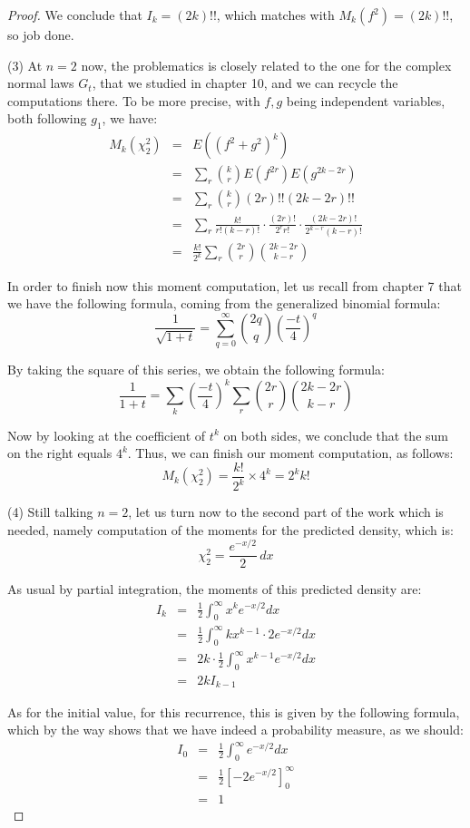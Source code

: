 \documentclass[12pt]{amsbook}
\begin{document}
\begin{proof}
We conclude that $I_k=(2k)!!$, which matches with $M_k(f^2)=(2k)!!$, so job done.

\medskip

(3) At $n=2$ now, the problematics is closely related to the one for the complex normal laws $G_t$, that we studied in chapter 10, and we can recycle the computations there. To be more precise, with $f,g$ being independent variables, both following $g_1$, we have:
\begin{eqnarray*}
M_k(\chi_2^2)
&=&E((f^2+g^2)^k)\\
&=&\sum_r\binom{k}{r}E(f^{2r})E(g^{2k-2r})\\
&=&\sum_r\binom{k}{r}(2r)!!(2k-2r)!!\\
&=&\sum_r\frac{k!}{r!(k-r)!}\cdot\frac{(2r)!}{2^rr!}\cdot\frac{(2k-2r)!}{2^{k-r}(k-r)!}\\
&=&\frac{k!}{2^k}\sum_r\binom{2r}{r}\binom{2k-2r}{k-r}
\end{eqnarray*}

In order to finish now this moment computation, let us recall from chapter 7 that we have the following formula, coming from the generalized binomial formula:
$$\frac{1}{\sqrt{1+t}}=\sum_{q=0}^\infty\binom{2q}{q}\left(\frac{-t}{4}\right)^q$$

By taking the square of this series, we obtain the following formula:
$$\frac{1}{1+t}
=\sum_k\left(\frac{-t}{4}\right)^k\sum_r\binom{2r}{r}\binom{2k-2r}{k-r}$$

Now by looking at the coefficient of $t^k$ on both sides, we conclude that the sum on the right equals $4^k$. Thus, we can finish our moment computation, as follows:
$$M_k(\chi_2^2)=\frac{k!}{2^k}\times 4^k=2^kk!$$

(4) Still talking $n=2$, let us turn now to the second part of the work which is needed, namely computation of the moments for the predicted density, which is:
$$\chi_2^2=\frac{e^{-x/2}}{2}\,dx$$

As usual by partial integration, the moments of this predicted density are:
\begin{eqnarray*}
I_k
&=&\frac{1}{2}\int_0^\infty x^ke^{-x/2}dx\\
&=&\frac{1}{2}\int_0^\infty kx^{k-1}\cdot 2e^{-x/2}dx\\
&=&2k\cdot\frac{1}{2}\int_0^\infty x^{k-1}e^{-x/2}dx\\
&=&2kI_{k-1}
\end{eqnarray*}

As for the initial value, for this recurrence, this is given by the following formula, which by the way shows that we have indeed a probability measure, as we should:
\begin{eqnarray*}
I_0
&=&\frac{1}{2}\int_0^\infty e^{-x/2}dx\\
&=&\frac{1}{2}\left[-2e^{-x/2}\right]_0^\infty\\
&=&1
\end{eqnarray*}


\end{proof}
\end{document}
